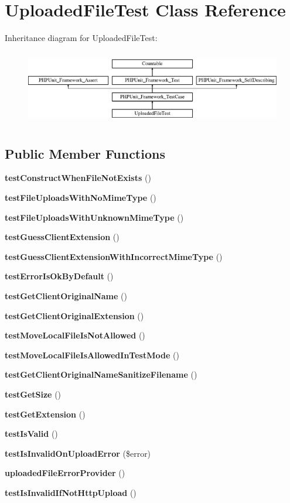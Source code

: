 \section{Uploaded\+File\+Test Class Reference}
\label{class_symfony_1_1_component_1_1_http_foundation_1_1_tests_1_1_file_1_1_uploaded_file_test}
Inheritance diagram for Uploaded\+File\+Test\+:\begin{figure}[H]
\begin{center}
\leavevmode
\includegraphics[height=3.303835cm]{class_symfony_1_1_component_1_1_http_foundation_1_1_tests_1_1_file_1_1_uploaded_file_test}
\end{center}
\end{figure}
\subsection*{Public Member Functions}
\begin{DoxyCompactItemize}
\item 
{\bf test\+Construct\+When\+File\+Not\+Exists} ()
\item 
{\bf test\+File\+Uploads\+With\+No\+Mime\+Type} ()
\item 
{\bf test\+File\+Uploads\+With\+Unknown\+Mime\+Type} ()
\item 
{\bf test\+Guess\+Client\+Extension} ()
\item 
{\bf test\+Guess\+Client\+Extension\+With\+Incorrect\+Mime\+Type} ()
\item 
{\bf test\+Error\+Is\+Ok\+By\+Default} ()
\item 
{\bf test\+Get\+Client\+Original\+Name} ()
\item 
{\bf test\+Get\+Client\+Original\+Extension} ()
\item 
{\bf test\+Move\+Local\+File\+Is\+Not\+Allowed} ()
\item 
{\bf test\+Move\+Local\+File\+Is\+Allowed\+In\+Test\+Mode} ()
\item 
{\bf test\+Get\+Client\+Original\+Name\+Sanitize\+Filename} ()
\item 
{\bf test\+Get\+Size} ()
\item 
{\bf test\+Get\+Extension} ()
\item 
{\bf test\+Is\+Valid} ()
\item 
{\bf test\+Is\+Invalid\+On\+Upload\+Error} (\$error)
\item 
{\bf uploaded\+File\+Error\+Provider} ()
\item 
{\bf test\+Is\+Invalid\+If\+Not\+Http\+Upload} ()
\end{DoxyCompactItemize}
